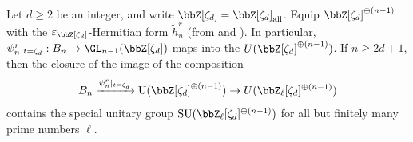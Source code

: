 \begin{corollary} \label{corollary:ell_adic_image_of_reduced_burau_representation_contains_SU}
    Let $d \geq 2$ be an integer, and write $\bbZ[\zeta_d] = \bbZ[\zeta_d]_{\text{all}}$. Equip $\bbZ[\zeta_d]^{\oplus (n-1)}$ with the $\varepsilon_{\bbZ[\zeta_d]}$-Hermitian form $\tilde{h}_n^r$ (from  and ). In particular, $\psi_n^r|_{t=\zeta_d}: B_n \to \GL_{n-1}(\bbZ[\zeta_d])$ maps into the  $U(\bbZ[\zeta_d]^{\oplus(n-1)})$. If $n \geq 2d+1$, then the closure of the image of the composition
    $$B_n \xrightarrow{\psi_n^r|_{t=\zeta_d}} \mathrm{U}(\bbZ[\zeta_d]^{\oplus(n-1)}) \to U(\bbZ_\ell[\zeta_d]^{\oplus (n-1)})$$
    contains the special unitary group $\mathrm{SU}(\bbZ_\ell[\zeta_d]^{\oplus (n-1)})$ for all but finitely many prime numbers $\ell$.
\end{corollary}